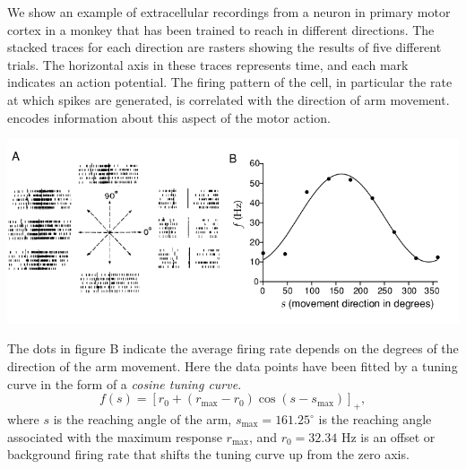 \begin{exm}
  \label{fig:1.6}
  We show an example of extracellular recordings from a neuron in primary motor cortex 
  in a monkey
  that has been trained to reach in different directions. The stacked traces for
  each direction are rasters showing the results of five different trials. The
  horizontal axis in these traces represents time, and each mark indicates
  an action potential. The firing pattern of the cell, in particular the rate at
  which spikes are generated, is correlated with the direction of arm movement.%
  encodes information about this aspect of the motor action.
  \begin{center}
    \includegraphics[scale=0.3]{./png/fig_1_6.png}
  \end{center}
  The dots in figure B indicate the average firing rate depends 
  on the degrees of the direction of the arm movement.
  Here the data points have
  been fitted by a tuning curve in the form of a \emph{cosine tuning curve}.
  \begin{equation}
    \label{equ:1.16}
    f(s)=[r_0+\left(r_{\text{max}}-r_0\right)\cos\left(s-s_{\text{max}}\right)]_+,
  \end{equation}
  where $s$ is the reaching angle of the arm, $s_{\text{max}}=161.25^\circ$ is the reaching 
  angle associated with the maximum response $r_{\text{max}}$, and $r_0=32.34$ Hz is an 
  offset or background
  firing rate that shifts the tuning curve up from the zero axis. 
\end{exm}

